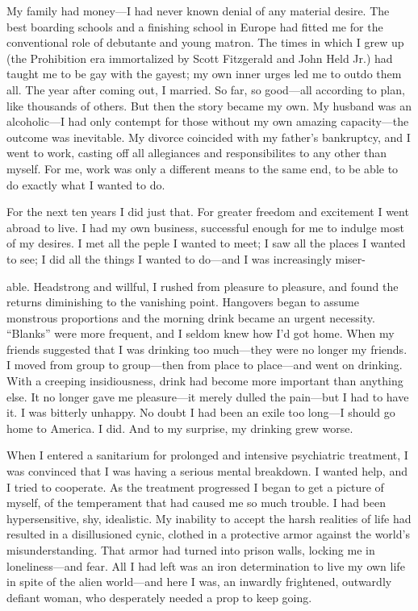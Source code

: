 \begin{biblechapter}
My family had money—I had never known denial of any material desire. The best boarding schools and a finishing school in Europe had fitted me for the conventional role of debutante and young matron. The times in which I grew up (the Prohibition era immortalized by Scott Fitzgerald and John Held Jr.) had taught me to be gay with the gayest; my own inner urges led me to outdo them all. The year after coming out, I married. So far, so good—all according to plan, like thousands of others. But then the story became my own. My husband was an alcoholic—I had only contempt for those without my own amazing capacity—the outcome was inevitable. My divorce coincided with my father’s bankruptcy, and I went to work, casting off all allegiances and responsibilites to any other than myself. For me, work was only a different means to the same end, to be able to do exactly what I wanted to do.

For the next ten years I did just that. For greater freedom and excitement I went abroad to live. I had my own business, successful enough for me to indulge most of my desires. I met all the peple I wanted to meet; I saw all the places I wanted to see; I did all the things I wanted to do—and I was increasingly miser-

able. Headstrong and willful, I rushed from pleasure to pleasure, and found the returns diminishing to the vanishing point. Hangovers began to assume monstrous proportions and the morning drink became an urgent necessity. “Blanks” were more frequent, and I seldom knew how I’d got home. When my friends suggested that I was drinking too much—they were no longer my friends. I moved from group to group—then from place to place—and went on drinking. With a creeping insidiousness, drink had become more important than anything else. It no longer gave me pleasure—it merely dulled the pain—but I had to have it. I was bitterly unhappy. No doubt I had been an exile too long—I should go home to America. I did. And to my surprise, my drinking grew worse.

When I entered a sanitarium for prolonged and intensive psychiatric treatment, I was convinced that I was having a serious mental breakdown. I wanted help, and I tried to cooperate. As the treatment progressed I began to get a picture of myself, of the temperament that had caused me so much trouble. I had been hypersensitive, shy, idealistic. My inability to accept the harsh realities of life had resulted in a disillusioned cynic, clothed in a protective armor against the world’s misunderstanding. That armor had turned into prison walls, locking me in loneliness—and fear. All I had left was an iron determination to live my own life in spite of the alien world—and here I was, an inwardly frightened, outwardly defiant woman, who desperately needed a prop to keep going.


\end{biblechapter}
